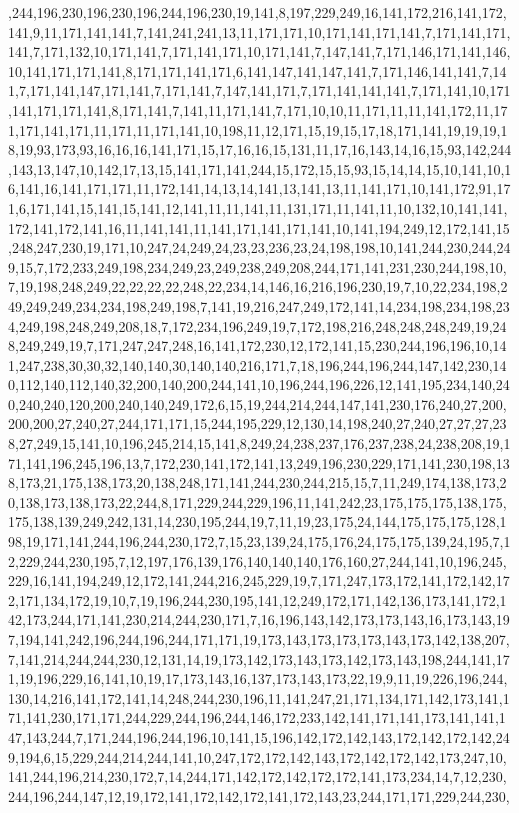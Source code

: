 ,244,196,230,196,230,196,244,196,230,19,141,8,197,229,249,16,141,172,216,141,172,141,9,11,171,141,141,7,141,241,241,13,11,171,171,10,171,141,171,141,7,171,141,171,141,7,171,132,10,171,141,7,171,141,171,10,171,141,7,147,141,7,171,146,171,141,146,10,141,171,171,141,8,171,171,141,171,6,141,147,141,147,141,7,171,146,141,141,7,141,7,171,141,147,171,141,7,171,141,7,147,141,171,7,171,141,141,141,7,171,141,10,171,141,171,171,141,8,171,141,7,141,11,171,141,7,171,10,10,11,171,11,11,141,172,11,171,171,141,171,11,171,11,171,141,10,198,11,12,171,15,19,15,17,18,171,141,19,19,19,18,19,93,173,93,16,16,16,141,171,15,17,16,16,15,131,11,17,16,143,14,16,15,93,142,244,143,13,147,10,142,17,13,15,141,171,141,244,15,172,15,15,93,15,14,14,15,10,141,10,16,141,16,141,171,171,11,172,141,14,13,14,141,13,141,13,11,141,171,10,141,172,91,171,6,171,141,15,141,15,141,12,141,11,11,141,11,131,171,11,141,11,10,132,10,141,141,172,141,172,141,16,11,141,141,11,141,171,141,171,141,10,141,194,249,12,172,141,15,248,247,230,19,171,10,247,24,249,24,23,23,236,23,24,198,198,10,141,244,230,244,249,15,7,172,233,249,198,234,249,23,249,238,249,208,244,171,141,231,230,244,198,10,7,19,198,248,249,22,22,22,22,248,22,234,14,146,16,216,196,230,19,7,10,22,234,198,249,249,249,234,234,198,249,198,7,141,19,216,247,249,172,141,14,234,198,234,198,234,249,198,248,249,208,18,7,172,234,196,249,19,7,172,198,216,248,248,248,249,19,248,249,249,19,7,171,247,247,248,16,141,172,230,12,172,141,15,230,244,196,196,10,141,247,238,30,30,32,140,140,30,140,140,216,171,7,18,196,244,196,244,147,142,230,140,112,140,112,140,32,200,140,200,244,141,10,196,244,196,226,12,141,195,234,140,240,240,240,120,200,240,140,249,172,6,15,19,244,214,244,147,141,230,176,240,27,200,200,200,27,240,27,244,171,171,15,244,195,229,12,130,14,198,240,27,240,27,27,27,238,27,249,15,141,10,196,245,214,15,141,8,249,24,238,237,176,237,238,24,238,208,19,171,141,196,245,196,13,7,172,230,141,172,141,13,249,196,230,229,171,141,230,198,138,173,21,175,138,173,20,138,248,171,141,244,230,244,215,15,7,11,249,174,138,173,20,138,173,138,173,22,244,8,171,229,244,229,196,11,141,242,23,175,175,175,138,175,175,138,139,249,242,131,14,230,195,244,19,7,11,19,23,175,24,144,175,175,175,128,198,19,171,141,244,196,244,230,172,7,15,23,139,24,175,176,24,175,175,139,24,195,7,12,229,244,230,195,7,12,197,176,139,176,140,140,140,176,160,27,244,141,10,196,245,229,16,141,194,249,12,172,141,244,216,245,229,19,7,171,247,173,172,141,172,142,172,171,134,172,19,10,7,19,196,244,230,195,141,12,249,172,171,142,136,173,141,172,142,173,244,171,141,230,214,244,230,171,7,16,196,143,142,173,173,143,16,173,143,197,194,141,242,196,244,196,244,171,171,19,173,143,173,173,173,143,173,142,138,207,7,141,214,244,244,230,12,131,14,19,173,142,173,143,173,142,173,143,198,244,141,171,19,196,229,16,141,10,19,17,173,143,16,137,173,143,173,22,19,9,11,19,226,196,244,130,14,216,141,172,141,14,248,244,230,196,11,141,247,21,171,134,171,142,173,141,171,141,230,171,171,244,229,244,196,244,146,172,233,142,141,171,141,173,141,141,147,143,244,7,171,244,196,244,196,10,141,15,196,142,172,142,143,172,142,172,142,249,194,6,15,229,244,214,244,141,10,247,172,172,142,143,172,142,172,142,173,247,10,141,244,196,214,230,172,7,14,244,171,142,172,142,172,172,141,173,234,14,7,12,230,244,196,244,147,12,19,172,141,172,142,172,141,172,143,23,244,171,171,229,244,230,